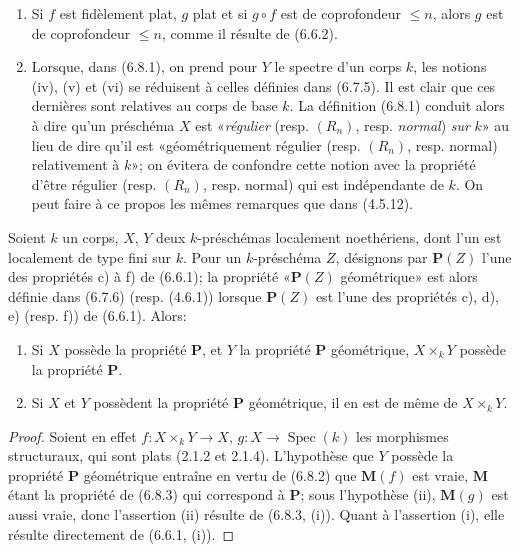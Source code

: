 \begin{remarks}[6.8.4]
\label{IV.2.s6.8.4-fr}
\begin{enumerate}
\item[(i)] Si $f$ est fidèlement plat, $g$ plat et si $g\circ f$ est de
coprofondeur $\leq n$, alors $g$ est de coprofondeur $\leq n$, comme il
résulte de (6.6.2).
\item[(ii)] Lorsque, dans (6.8.1), on prend pour $Y$ le spectre d'un corps
$k$, les notions (iv), (v) et (vi) se réduisent à celles définies dans (6.7.5).
Il est clair que ces dernières sont relatives au corps de base $k$. La
définition (6.8.1) conduit alors à dire qu'un préschéma $X$ est «\emph{régulier}
(resp. $(R_n)$, resp. \emph{normal}) \emph{sur} $k$» au lieu de dire qu'il est
«géométriquement régulier (resp. $(R_n)$, resp. normal) relativement à $k$»;
on évitera de confondre cette notion avec la propriété d'être régulier (resp.
$(R_n)$, resp. normal) qui est indépendante de $k$. On peut faire à ce propos
les mêmes remarques que dans (4.5.12).
\end{enumerate}
\end{remarks}

\begin{proposition}[6.8.5]
\label{IV.2.s6.8.5-fr}
Soient $k$ un corps, $X$, $Y$ deux $k$-préschémas localement noethériens,
dont l'un est localement de type fini sur $k$. Pour un $k$-préschéma $Z$,
désignons par $\boldsymbol{P}(Z)$ l'une des propriétés \textup{c)} à \textup{f)} de \textup{(6.6.1)}; la propriété
«$\boldsymbol{P}(Z)$ géométrique» est alors définie dans \textup{(6.7.6) (resp. (4.6.1))} lorsque
$\boldsymbol{P}(Z)$ est l'une des propriétés \textup{c), d), e) (resp. f))} de \textup{(6.6.1)}. Alors:
\begin{enumerate}
\item[\textup{(i)}] Si $X$ possède la propriété $\boldsymbol{P}$, et $Y$ la propriété $\boldsymbol{P}$
géométrique, $X\times_kY$ possède la propriété $\boldsymbol{P}$.
\item[\textup{(ii)}] Si $X$ et $Y$ possèdent la propriété $\boldsymbol{P}$ géométrique, il en est
de même de $X\times_kY$.
\end{enumerate}
\end{proposition}

\begin{proof}
Soient en effet $f:X\times_kY\to X$, $g:X\to\operatorname{Spec}(k)$ les
morphismes structuraux, qui sont plats (2.1.2 et 2.1.4). L'hypothèse que
$Y$ possède la propriété $\boldsymbol{P}$ géométrique entraîne en vertu de (6.8.2) que
$\boldsymbol{M}(f)$ est vraie, $\boldsymbol{M}$ étant la propriété de (6.8.3) qui correspond à $\boldsymbol{P}$; sous
l'hypothèse (ii), $\boldsymbol{M}(g)$ est aussi vraie, donc l'assertion (ii) résulte de
(6.8.3, (i)). Quant à l'assertion (i), elle résulte directement de (6.6.1, (i)).
\end{proof}

